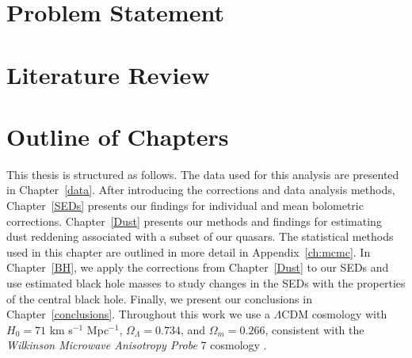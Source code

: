 





\section{Problem Statement} \label{sec:dust_intro}

\section{Literature Review} \label{sec:intro_MBH}


\section{Outline of Chapters}

This thesis is structured as follows. The data used for this analysis are presented in Chapter~\ref{data}.  After introducing the corrections and data analysis methods, Chapter~\ref{SEDs} presents our findings for individual and mean bolometric corrections.  Chapter~\ref{Dust} presents our methods and findings for estimating dust reddening associated with a subset of our quasars.  The statistical methods used in this chapter are outlined in more detail in Appendix~\ref{ch:mcmc}. In Chapter~\ref{BH}, we apply the corrections from Chapter~\ref{Dust} to our SEDs and use estimated black hole masses to study changes in the SEDs with the properties of the central black hole. Finally, we present our conclusions in Chapter~\ref{conclusions}. Throughout this work we use a $\Lambda$CDM cosmology with $H_0=71$ km s$^{-1}$ Mpc$^{-1}$, $\Omega_\Lambda = 0.734$, and $\Omega_m = 0.266$, consistent with the {\em Wilkinson Microwave Anisotropy Probe} 7 cosmology \citep{Jarosik:2011}.

